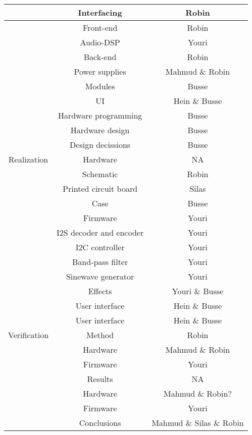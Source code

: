 \begin{justify}
\begin{longtable}{|c|c|c|}
								& Interfacing					& Robin						\\ \hline
								& Front-end						& Robin						\\ \hline
								& Audio-DSP						& Youri						\\ \hline
								& Back-end						& Robin						\\ \hline
								& Power supplies				& Mahmud \& Robin			\\ \hline
								& Modules						& Busse						\\ \hline
								& UI							& Hein \& Busse				\\ \hline
								& Hardware programming			& Busse						\\ \hline
								& Hardware design				& Busse						\\ \hline
								& Design decissions				& Busse						\\ \hline
	Realization					& Hardware						& NA						\\ \hline
								& Schematic						& Robin						\\ \hline
								& Printed circuit board			& Silas						\\ \hline
								& Case							& Busse						\\ \hline
								& Firmware						& Youri						\\ \hline
								& I2S decoder and encoder		& Youri						\\ \hline
								& I2C controller				& Youri						\\ \hline
								& Band-pass filter				& Youri						\\ \hline
								& Sinewave generator			& Youri						\\ \hline
								& Effects						& Youri \& Busse			\\ \hline
								& User interface				& Hein \& Busse				\\ \hline
								& User interface				& Hein \& Busse				\\ \hline
	Verification				& Method						& Robin						\\ \hline
								& Hardware						& Mahmud \& Robin			\\ \hline
								& Firmware						& Youri						\\ \hline
								& Results						& NA						\\ \hline
								& Hardware						& Mahmud \& Robin?			\\ \hline
								& Firmware						& Youri						\\ \hline
								& Conclusions					& Mahmud \& Silas \& Robin 	\\ \hline

\end{longtable}
\end{justify}
